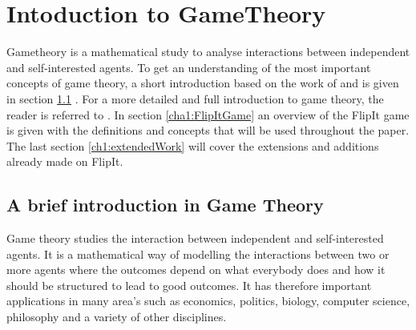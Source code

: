 \chapter{Intoduction to GameTheory}
\label{Chapter1:Intro.Game.Theory}
%


Gametheory is a mathematical study to analyse interactions between independent and self-interested agents. To get an understanding of the most important concepts of game theory, a short introduction based on the work of 
\cite{leyton2008essentials} and \cite{Coursera} is given in section \ref{Cha1:briefintro}  . For a more detailed and full introduction to game theory, the reader is referred to 
\cite{leyton2008essentials}.  In section \ref{cha1:FlipItGame} an overview of the FlipIt game is given with the definitions and concepts that will be used throughout the paper. 
The last section \ref{ch1:extendedWork} will cover the extensions and additions already made on FlipIt.

\section{A brief introduction in Game Theory}
\label{Cha1:briefintro}





Game theory studies the interaction between independent and self-interested agents. It is a mathematical way of modelling the interactions between two or more agents where the outcomes depend on what everybody does and how it should be structured to lead to good outcomes. It has therefore important applications in many area's such as economics, politics, biology, computer science, philosophy and a variety of other disciplines.  \\

